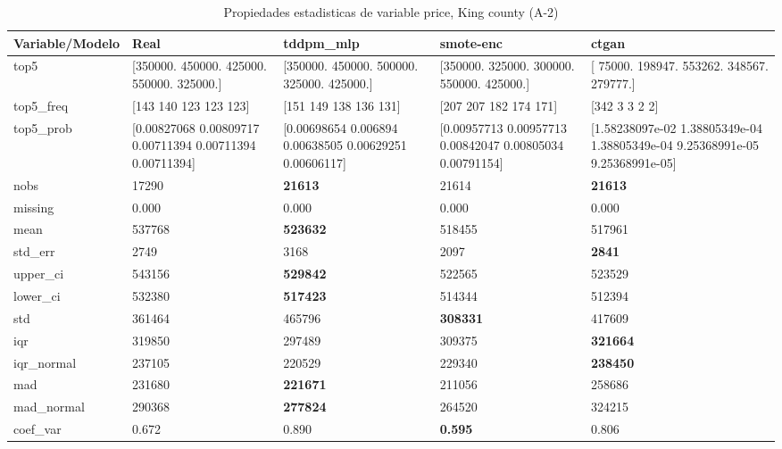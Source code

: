 \begin{table}[H]
\centering
\fontsize{8}{14}\selectfont
\caption{Propiedades  estadisticas de variable price, King county (A-2)}
\label{table-stats-king county-a-2-price}
\begin{tabular}{|l|m{10em}|m{10em}|m{10em}|m{10em}|}
\hline
 \rowcolor[gray]{0.8}
Variable/Modelo & Real & tddpm\_mlp & smote-enc & ctgan \\
\hline top5 & [350000. 450000. 425000. 550000. 325000.] & [350000. 450000. 500000. 325000. 425000.] & [350000. 325000. 300000. 550000. 425000.] & [ 75000. 198947. 553262. 348567. 279777.] \\
\hline top5\_freq & [143 140 123 123 123] & [151 149 138 136 131] & [207 207 182 174 171] & [342   3   3   2   2] \\
\hline top5\_prob & [0.00827068 0.00809717 0.00711394 0.00711394 0.00711394] & [0.00698654 0.006894   0.00638505 0.00629251 0.00606117] & [0.00957713 0.00957713 0.00842047 0.00805034 0.00791154] & [1.58238097e-02 1.38805349e-04 1.38805349e-04 9.25368991e-05
 9.25368991e-05] \\
\hline nobs & 17290 & \bfseries 21613 & \cellcolor[rgb]{0.9, 0.54, 0.52} 21614 & \bfseries 21613 \\
\hline missing & 0.000 & 0.000 & 0.000 & 0.000 \\
\hline mean & 537768 & \bfseries 523632 & 518455 & \cellcolor[rgb]{0.9, 0.54, 0.52} 517961 \\
\hline std\_err & 2749 & 3168 & \cellcolor[rgb]{0.9, 0.54, 0.52} 2097 & \bfseries 2841 \\
\hline upper\_ci & 543156 & \bfseries 529842 & \cellcolor[rgb]{0.9, 0.54, 0.52} 522565 & 523529 \\
\hline lower\_ci & 532380 & \bfseries 517423 & 514344 & \cellcolor[rgb]{0.9, 0.54, 0.52} 512394 \\
\hline std & 361464 & \cellcolor[rgb]{0.9, 0.54, 0.52} 465796 & \bfseries 308331 & 417609 \\
\hline iqr & 319850 & \cellcolor[rgb]{0.9, 0.54, 0.52} 297489 & 309375 & \bfseries 321664 \\
\hline iqr\_normal & 237105 & \cellcolor[rgb]{0.9, 0.54, 0.52} 220529 & 229340 & \bfseries 238450 \\
\hline mad & 231680 & \bfseries 221671 & 211056 & \cellcolor[rgb]{0.9, 0.54, 0.52} 258686 \\
\hline mad\_normal & 290368 & \bfseries 277824 & 264520 & \cellcolor[rgb]{0.9, 0.54, 0.52} 324215 \\
\hline coef\_var & 0.672 & \cellcolor[rgb]{0.9, 0.54, 0.52} 0.890 & \bfseries 0.595 & 0.806 \\

\end{tabular}
\end{table}
